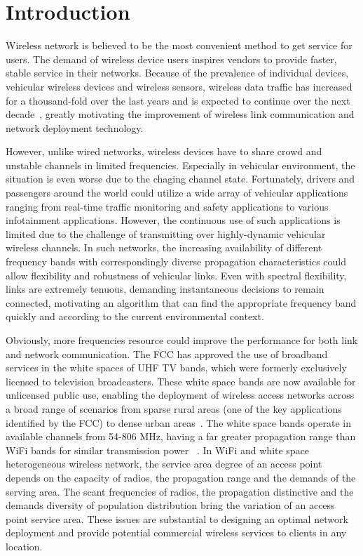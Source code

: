 \chapter{Introduction} \label{ch:introduction}

Wireless network is believed to be the most convenient method to get service 
for users. The demand of wireless device users inspires vendors to provide 
faster, stable service in their networks. Because of the prevalence of 
individual devices, vehicular wireless devices and wireless sensors, wireless 
data traffic has increased for a thousand-fold over the last years and is 
expected to continue over the next decade~\cite{metis}, greatly motivating 
the improvement of wireless link communication and network deployment technology.

However, unlike wired networks, wireless devices have to share crowd
and unstable channels in limited frequencies. Especially in vehicular
environment, the situation is even worse due to the chaging channel 
state. Fortunately, drivers and passengers around the world could utilize a 
wide array of vehicular applications ranging from real-time traffic 
monitoring and safety applications to various infotainment applications.
However, the continuous use of such applications is limited due to the
challenge of transmitting over highly-dynamic vehicular wireless channels.
In such networks, the increasing availability of different frequency bands 
with correspondingly diverse propagation characteristics could allow flexibility 
and robustness of vehicular links. Even with spectral flexibility, links are 
extremely tenuous, demanding instantaneous decisions to remain connected, 
motivating an algorithm that can find the appropriate frequency band quickly 
and according to the current environmental context.

Obviously, more frequencies resource could improve the performance for 
both link and network communication. The FCC has approved the use of broadband 
services in the white spaces of UHF TV bands, which were formerly exclusively 
licensed to television broadcasters. These white space bands are now available 
for unlicensed public use, enabling the deployment of wireless access networks 
across a broad range of scenarios from sparse rural areas (one of the key 
applications identified by the FCC) to dense urban areas~\cite{carlson}. The 
white space bands operate in available channels from 54-806 MHz, having a far 
greater propagation range than WiFi bands for similar transmission power
~\cite{balanis2012antenna}. In WiFi and white space heterogeneous wireless 
network, the service area degree of an access point depends on the capacity 
of radios, the propagation range and the demands of the serving area. The scant 
frequencies of radios, the propagation distinctive and the demands diversity 
of population distribution bring the variation of an access point service area. 
These issues are substantial to designing an optimal network deployment and 
provide potential commercial wireless services to clients in any location.

